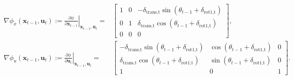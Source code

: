 \begin{align}
    \nabla\phi_x(\mathbf{x}_{t-1},\mathbf{u}_t) :=
    \left.\frac{\partial\phi}{\partial \mathbf{x}_{t-1}}\right\vert_{\mathbf{x}_{t-1},\mathbf{u}_t}
    =
     & \begin{bmatrix}
        1 & 0 & -\delta_{\text{trans,t}}\sin(\theta_{t-1} + \delta_{\text{rot1,t}}) \\
        0 & 1 & \delta_{\text{trans,t}}\cos(\theta_{t-1} + \delta_{\text{rot1,t}})  \\
        0 & 0 & 0
    \end{bmatrix}, \label{eq:motmodel-jacobi-x} \\
    \nabla\phi_u(\mathbf{x}_{t-1},\mathbf{u}_t) :=
    \left.\frac{\partial\phi}{\partial \mathbf{u}_{t}}\right\vert_{\mathbf{x}_{t-1},\mathbf{u}_t}
    =
     & \begin{bmatrix}
        -\delta_{\text{trans,t}}\sin(\theta_{t-1} + \delta_{\text{rot1,t}}) & \cos(\theta_{t-1} + \delta_{\text{rot1,t}}) & 0 \\
        \delta_{\text{trans,t}}\cos(\theta_{t-1} + \delta_{\text{rot1,t}})  & \sin(\theta_{t-1} + \delta_{\text{rot1,t}}) & 0 \\
        1                                                                   & 0                                           & 1
    \end{bmatrix}. \label{eq:motmodel-jacobi-u}
\end{align}
